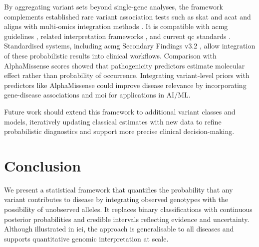 
By aggregating variant sets beyond single-gene analyses, the framework complements established rare variant association tests such as \ac{skat} and \ac{acat} \cite{liu2019acat,li2020dynamic,wu2011rare,lee2012optimal} and aligns with multi-omics integration methods \cite{kong2018nature,howe2021within}. It is compatible with \ac{acmg} guidelines \cite{richards2015standards}, related interpretation frameworks \cite{tavtigian2020fitting,li2017intervar}, and current \ac{qc} standards \cite{pedersen2021effective,anderson2010data}. Standardised systems, including \ac{acmg} Secondary Findings v3.2 \cite{miller2023acmg}, allow integration of these probabilistic results into clinical workflows.
Comparison with AlphaMissense scores showed that pathogenicity predictors estimate molecular effect rather than probability of occurrence. Integrating variant-level priors with predictors like AlphaMissense could improve disease relevance by incorporating gene-disease associations  and \ac{moi} for applications in AI/ML.

Future work should extend this framework to additional variant classes and models, iteratively updating classical estimates with new data to refine probabilistic diagnostics and support more precise clinical decision-making.

\section{Conclusion}

We present a statistical framework that quantifies the probability that any variant contributes to disease by integrating observed genotypes with the possibility of unobserved alleles. It replaces binary classifications with continuous posterior probabilities and credible intervals reflecting evidence and uncertainty. 
Although illustrated in \ac{iei}, the approach is generalisable to all diseases and supports quantitative genomic interpretation at scale.

